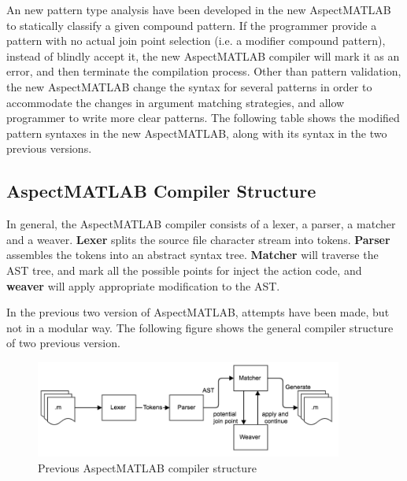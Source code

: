 \documentclass{comp621}
\begin{document}


An new pattern type analysis have been developed in the new AspectMATLAB to
statically classify a given compound pattern. If the programmer provide a
pattern with no actual join point selection (i.e. a modifier compound pattern),
instead of blindly accept it, the new AspectMATLAB compiler will mark it as an
error, and then terminate the compilation process. Other than pattern
validation, the new AspectMATLAB change the syntax for several patterns in
order to accommodate the changes in argument matching strategies, and allow
programmer to write more clear patterns. The following table shows the modified
pattern syntaxes in the new AspectMATLAB, along with its syntax in the two
previous versions.



\subsection{AspectMATLAB Compiler Structure}
In general, the AspectMATLAB compiler consists of a lexer, a parser, a matcher
and a weaver. \textbf{Lexer} splits the source file character stream into
tokens. \textbf{Parser} assembles the tokens into an abstract syntax tree.
\textbf{Matcher} will traverse the AST tree, and mark all the possible points
for inject the action code, and \textbf{weaver} will apply appropriate
modification to the AST.

In the previous two version of AspectMATLAB, attempts have been made, but not
in a modular way. The following figure shows the general compiler structure of
two previous version.

\begin{figure}[!htbp]
    \begin{center}
    \includegraphics[width=0.9\textwidth]{figures/previous_compiler_structure}
    \end{center}
    \caption{Previous AspectMATLAB compiler structure}
\end{figure}
\end{document}
